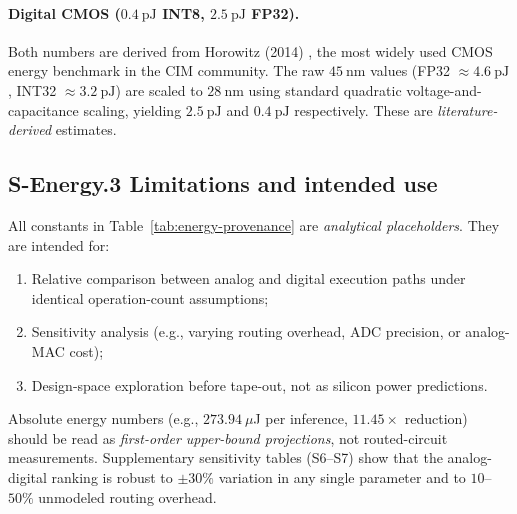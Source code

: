 \paragraph{Digital CMOS ($0.4~\text{pJ}$ INT8, $2.5~\text{pJ}$ FP32).}
Both numbers are derived from Horowitz (2014) \cite{horowitz2014computing}, the most widely used CMOS energy benchmark in the CIM community.  The raw $45~\text{nm}$ values (FP32 $\approx 4.6~\text{pJ}$, INT32 $\approx 3.2~\text{pJ}$) are scaled to $28~\text{nm}$ using standard quadratic voltage-and-capacitance scaling, yielding $2.5~\text{pJ}$ and $0.4~\text{pJ}$ respectively.  These are \emph{literature-derived} estimates.

\subsection*{S-Energy.3 Limitations and intended use}

All constants in Table~\ref{tab:energy-provenance} are \emph{analytical placeholders}.  They are intended for:
\begin{enumerate}[leftmargin=1.2em]
    \item Relative comparison between analog and digital execution paths under identical operation-count assumptions;
    \item Sensitivity analysis (e.g., varying routing overhead, ADC precision, or analog-MAC cost);
    \item Design-space exploration before tape-out, not as silicon power predictions.
\end{enumerate}

Absolute energy numbers (e.g., $273.94~\mu$J per inference, $11.45\times$ reduction) should be read as \emph{first-order upper-bound projections}, not routed-circuit measurements.  Supplementary sensitivity tables (S6--S7) show that the analog-digital ranking is robust to $\pm 30\%$ variation in any single parameter and to $10$--$50\%$ unmodeled routing overhead.
